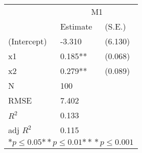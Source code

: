 \begin{tabular}{*{3}{l}}
\hline
                  & \multicolumn{2}{c}{M1}   \tabularnewline
                   &Estimate  &(S.E.)  \tabularnewline
 \hline
 \hline
   (Intercept)     &-3.310   &   (6.130) \tabularnewline
   x1              &0.185**   &   (0.068) \tabularnewline
   x2              &0.279**   &   (0.089) \tabularnewline
 \hline
 N                 &100       &        \tabularnewline
 RMSE             &7.402         & \tabularnewline
 $R^2$             &0.133         & \tabularnewline
 adj $R^2$         &0.115         & \tabularnewline
 \hline
\hline
 
 \multicolumn{3}{c}{${*  p}\le 0.05$${*\!\!*  p}\le 0.01$${*\!\!*\!\!*  p}\le 0.001$}\tabularnewline
 \end{tabular}